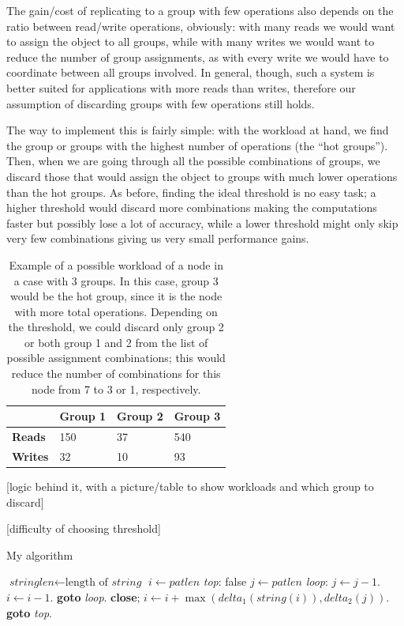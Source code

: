 The gain/cost of replicating to a group with few operations also depends on the ratio between read/write operations, obviously: with many reads we would want to assign the object to all groups, while with many writes we would want to reduce the number of group assignments, as with every write we would have to coordinate between all groups involved. In general, though, such a system is better suited for applications with more reads than writes, therefore our assumption of discarding groups with few operations still holds.

The way to implement this is fairly simple: with the workload at hand, we find the group or groups with the highest number of operations (the ``hot groups''). Then, when we are going through all the possible combinations of groups, we discard those that would assign the object to groups with much lower operations than the hot groups. As before, finding the ideal threshold is no easy task; a higher threshold would discard more combinations making the computations faster but possibly lose a lot of accuracy, while a lower threshold might only skip very few combinations giving us very small performance gains. 


\begin{table}[!htb]
  \centering
  \begin{tabular}{l l l l}
    \hline
    & \textbf{Group 1} & \textbf{Group 2} & \textbf{Group 3} \\
    \hline
    \textbf{Reads} & 150 & 37 & 540 \\
    \textbf{Writes} & 32 & 10 & 93 \\
    \hline
  \end{tabular}
  \caption{Example of a possible workload of a node in a case with 3 groups. In this case, group 3 would be the hot group, since it is the node with more total operations. Depending on the threshold, we could discard only group 2 or both group 1 and 2 from the list of possible assignment combinations; this would reduce the number of combinations for this node from 7 to 3 or 1, respectively.}\label{tab:workload-example}
\end{table}

[logic behind it, with a picture/table to show workloads and which group to discard]

[difficulty of choosing threshold]

\begin{algorithm}
  \caption{My algorithm}\label{euclid}
  \begin{algorithmic}[1]
  \State $\textit{stringlen} \gets \text{length of }\textit{string}$
  \State $i \gets \textit{patlen}$
  \State \emph{top}:
   \Return false
  \EndIf
  \State $j \gets \textit{patlen}$
  \State \emph{loop}:
  \State $j \gets j-1$.
  \State $i \gets i-1$.
  \State \textbf{goto} \emph{loop}.
  \State \textbf{close};
  \EndIf
  \State $i \gets i+\max(\textit{delta}_1(\textit{string}(i)),\textit{delta}_2(j))$.
  \State \textbf{goto} \emph{top}.
  \EndProcedure
  \end{algorithmic}
  \end{algorithm}

